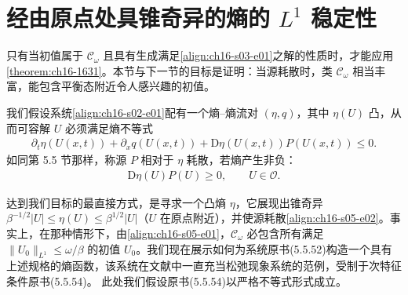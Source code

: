 \documentclass[../../main.tex]{subfiles}
\begin{document}
\section{经由原点处具锥奇异的熵的 $L^1$ 稳定性}\label{section:ch16-原点锥奇异熵l1稳定}

只有当初值属于 $\mathscr{C}_\omega$ 且具有生成满足\eqref{align:ch16-s03-e01}之解的性质时，才能应用\cref{theorem:ch16-1631}。本节与下一节的目标是证明：当源耗散时，类 $\mathscr{C}_\omega$ 相当丰富，能包含平衡态附近令人感兴趣的初值。

我们假设系统\eqref{align:ch16-s02-e01}配有一个熵--熵流对 $(\eta,q)$，其中 $\eta(U)$ 凸，从而可容解 $U$ 必须满足熵不等式
\begin{align}
\partial_t\eta(U(x,t))+\partial_xq(U(x,t))+\mathrm{D}\eta(U(x,t))P(U(x,t))\leqslant0.
\label{align:ch16-s05-e01}
\end{align}
如同第 5.5 节那样，称源 $P$ 相对于 $\eta$ 耗散，若熵产生非负：
\begin{align}
\mathrm{D}\eta(U)P(U)\geqslant0,\qquad U\in\mathscr{O}.
\label{align:ch16-s05-e02}
\end{align}

达到我们目标的最直接方式，是寻求一个凸熵 $\eta$，它展现出锥奇异 $\beta^{-1/2}|U|\leqslant\eta(U)\leqslant\beta^{1/2}|U|$（$U$ 在原点附近），并使源耗散\eqref{align:ch16-s05-e02}。事实上，在那种情形下，由\eqref{align:ch16-s05-e01}，$\mathscr{C}_\omega$ 必包含所有满足 $\|U_0\|_{L^1}\leqslant\omega/\beta$ 的初值 $U_0$。我们现在展示如何为系统原书(5.5.52)构造一个具有上述规格的熵函数，该系统在文献中一直充当松弛现象系统的范例，受制于次特征条件原书(5.5.54)。
此处我们假设原书(5.5.54)以严格不等式形式成立。
\end{document}
